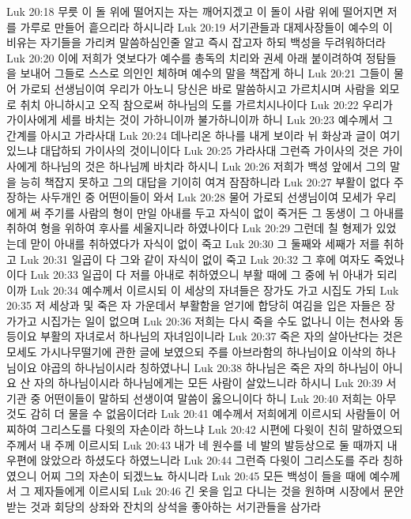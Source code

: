 Luk 20:18  무릇 이 돌 위에 떨어지는 자는 깨어지겠고 이 돌이 사람 위에 떨어지면 저를 가루로 만들어 흩으리라 하시니라
Luk 20:19  서기관들과 대제사장들이 예수의 이 비유는 자기들을 가리켜 말씀하심인줄 알고 즉시 잡고자 하되 백성을 두려워하더라
Luk 20:20  이에 저희가 엿보다가 예수를 총독의 치리와 권세 아래 붙이려하여 정탐들을 보내어 그들로 스스로 의인인 체하며 예수의 말을 책잡게 하니
Luk 20:21  그들이 물어 가로되 선생님이여 우리가 아노니 당신은 바로 말씀하시고 가르치시며 사람을 외모로 취치 아니하시고 오직 참으로써 하나님의 도를 가르치시나이다
Luk 20:22  우리가 가이사에게 세를 바치는 것이 가하니이까 불가하니이까 하니
Luk 20:23  예수께서 그 간계를 아시고 가라사대
Luk 20:24  데나리온 하나를 내게 보이라 뉘 화상과 글이 여기 있느냐 대답하되 가이사의 것이니이다
Luk 20:25  가라사대 그런즉 가이사의 것은 가이사에게 하나님의 것은 하나님께 바치라 하시니
Luk 20:26  저희가 백성 앞에서 그의 말을 능히 책잡지 못하고 그의 대답을 기이히 여겨 잠잠하니라
Luk 20:27  부활이 없다 주장하는 사두개인 중 어떤이들이 와서
Luk 20:28  물어 가로되 선생님이여 모세가 우리에게 써 주기를 사람의 형이 만일 아내를 두고 자식이 없이 죽거든 그 동생이 그 아내를 취하여 형을 위하여 후사를 세울지니라 하였나이다
Luk 20:29  그런데 칠 형제가 있었는데 맏이 아내를 취하였다가 자식이 없이 죽고
Luk 20:30  그 둘째와 세째가 저를 취하고
Luk 20:31  일곱이 다 그와 같이 자식이 없이 죽고
Luk 20:32  그 후에 여자도 죽었나이다
Luk 20:33  일곱이 다 저를 아내로 취하였으니 부활 때에 그 중에 뉘 아내가 되리이까
Luk 20:34  예수께서 이르시되 이 세상의 자녀들은 장가도 가고 시집도 가되
Luk 20:35  저 세상과 및 죽은 자 가운데서 부활함을 얻기에 합당히 여김을 입은 자들은 장가가고 시집가는 일이 없으며
Luk 20:36  저희는 다시 죽을 수도 없나니 이는 천사와 동등이요 부활의 자녀로서 하나님의 자녀임이니라
Luk 20:37  죽은 자의 살아난다는 것은 모세도 가시나무떨기에 관한 글에 보였으되 주를 아브라함의 하나님이요 이삭의 하나님이요 야곱의 하나님이시라 칭하였나니
Luk 20:38  하나님은 죽은 자의 하나님이 아니요 산 자의 하나님이시라 하나님에게는 모든 사람이 살았느니라 하시니
Luk 20:39  서기관 중 어떤이들이 말하되 선생이여 말씀이 옳으니이다 하니
Luk 20:40  저희는 아무 것도 감히 더 물을 수 없음이더라
Luk 20:41  예수께서 저희에게 이르시되 사람들이 어찌하여 그리스도를 다윗의 자손이라 하느냐
Luk 20:42  시편에 다윗이 친히 말하였으되 주께서 내 주께 이르시되
Luk 20:43  내가 네 원수를 네 발의 발등상으로 둘 때까지 내 우편에 앉았으라 하셨도다 하였느니라
Luk 20:44  그런즉 다윗이 그리스도를 주라 칭하였으니 어찌 그의 자손이 되겠느뇨 하시니라
Luk 20:45  모든 백성이 들을 때에 예수께서 그 제자들에게 이르시되
Luk 20:46  긴 옷을 입고 다니는 것을 원하며 시장에서 문안 받는 것과 회당의 상좌와 잔치의 상석을 좋아하는 서기관들을 삼가라
